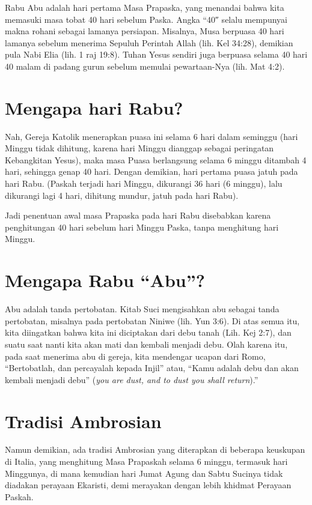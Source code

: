
Rabu Abu adalah hari pertama Masa Prapaska, yang menandai bahwa kita memasuki masa tobat 40 hari sebelum Paska. Angka ``40″ selalu mempunyai makna rohani sebagai lamanya persiapan. Misalnya, Musa berpuasa 40 hari lamanya sebelum menerima Sepuluh Perintah Allah (lih. Kel 34:28), demikian pula Nabi Elia (lih. 1 raj 19:8). Tuhan Yesus sendiri juga berpuasa selama 40 hari 40 malam di padang gurun sebelum memulai pewartaan-Nya (lih. Mat 4:2).

\section{Mengapa hari Rabu?}

Nah, Gereja Katolik menerapkan puasa ini selama 6 hari dalam seminggu (hari Minggu tidak dihitung, karena hari Minggu dianggap sebagai peringatan Kebangkitan Yesus), maka masa Puasa berlangsung selama 6 minggu ditambah 4 hari, sehingga genap 40 hari. Dengan demikian, hari pertama puasa jatuh pada hari Rabu. (Paskah terjadi hari Minggu, dikurangi 36 hari (6 minggu), lalu dikurangi lagi 4 hari, dihitung mundur, jatuh pada hari Rabu).

Jadi penentuan awal masa Prapaska pada hari Rabu disebabkan karena penghitungan 40 hari sebelum hari Minggu Paska, tanpa menghitung hari Minggu.

\section{Mengapa Rabu ``Abu''?}

Abu adalah tanda pertobatan. Kitab Suci mengisahkan abu sebagai tanda pertobatan, misalnya pada pertobatan Niniwe (lih. Yun 3:6). Di atas semua itu, kita diingatkan bahwa kita ini diciptakan dari debu tanah (Lih. Kej 2:7), dan suatu saat nanti kita akan mati dan kembali menjadi debu. Olah karena itu, pada saat menerima abu di gereja, kita mendengar ucapan dari Romo, ``Bertobatlah, dan percayalah kepada Injil'' atau, ``Kamu adalah debu dan akan kembali menjadi debu'' (\textit{you are dust, and to dust you shall return}).''

\section{Tradisi Ambrosian}

Namun demikian, ada tradisi Ambrosian yang diterapkan di beberapa keuskupan di Italia, yang menghitung Masa Prapaskah selama 6 minggu, termasuk hari Minggunya, di mana kemudian hari Jumat Agung dan Sabtu Sucinya tidak diadakan perayaan Ekaristi, demi merayakan dengan lebih khidmat Perayaan Paskah. 


